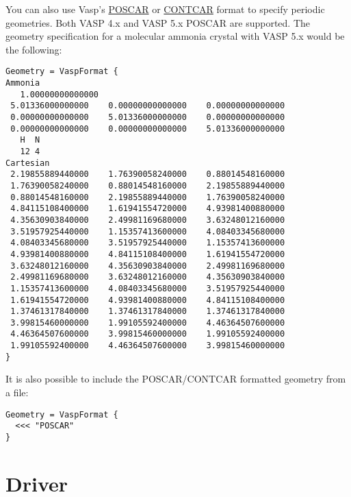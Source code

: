 You can also use Vasp's \href{https://www.vasp.at/wiki/index.php/POSCAR}{POSCAR} or
\href{https://www.vasp.at/wiki/index.php/CONTCAR}{CONTCAR} format to specify periodic geometries.
Both VASP 4.x and VASP 5.x POSCAR are supported.
The geometry specification for a molecular ammonia crystal with VASP 5.x would be the following:
\begin{verbatim}
Geometry = VaspFormat {
Ammonia
   1.00000000000000
 5.01336000000000    0.00000000000000    0.00000000000000
 0.00000000000000    5.01336000000000    0.00000000000000
 0.00000000000000    0.00000000000000    5.01336000000000
   H  N
   12 4
Cartesian
 2.19855889440000    1.76390058240000    0.88014548160000
 1.76390058240000    0.88014548160000    2.19855889440000
 0.88014548160000    2.19855889440000    1.76390058240000
 4.84115108400000    1.61941554720000    4.93981400880000
 4.35630903840000    2.49981169680000    3.63248012160000
 3.51957925440000    1.15357413600000    4.08403345680000
 4.08403345680000    3.51957925440000    1.15357413600000
 4.93981400880000    4.84115108400000    1.61941554720000
 3.63248012160000    4.35630903840000    2.49981169680000
 2.49981169680000    3.63248012160000    4.35630903840000
 1.15357413600000    4.08403345680000    3.51957925440000
 1.61941554720000    4.93981400880000    4.84115108400000
 1.37461317840000    1.37461317840000    1.37461317840000
 3.99815460000000    1.99105592400000    4.46364507600000
 4.46364507600000    3.99815460000000    1.99105592400000
 1.99105592400000    4.46364507600000    3.99815460000000
}
\end{verbatim}
It is also possible to include the POSCAR/CONTCAR formatted geometry from a file:
\begin{verbatim}
Geometry = VaspFormat {
  <<< "POSCAR"
}
\end{verbatim}


\section{Driver}
\label{sec:dftbp.Driver}

